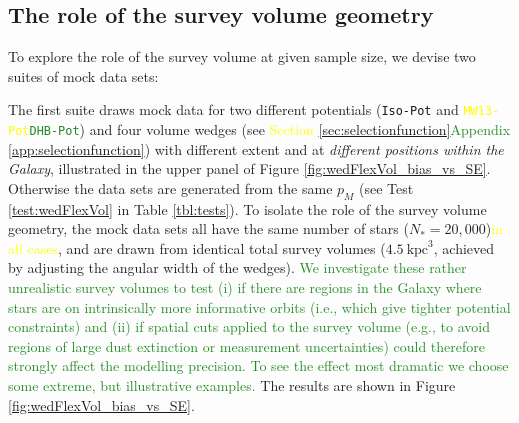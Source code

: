 \documentclass[iop,revtex4,numberedappendix,appendixfloats]{emulateapj}
\newcommand{\pmodel}{\ensuremath{p_M}}
\newcommand{\NEW}[1]{\textcolor{ForestGreen}{#1}}
\newcommand{\OLD}[1]{\textcolor{Yellow}{#1}}%
\begin{document}
\subsection{The role of the survey volume geometry} \label{sec:results_obsvolume}

To explore the role of the survey volume at given sample size, we devise two suites of mock data sets: 

The first suite draws mock data for two different potentials (\texttt{Iso-Pot} and \OLD{\texttt{MW13-Pot}}\NEW{\texttt{DHB-Pot}}) and four volume wedges (see \OLD{Section \ref{sec:selectionfunction}}\NEW{Appendix \ref{app:selectionfunction}}) with different extent and at {\it different positions within the Galaxy}, illustrated in the upper panel of Figure \ref{fig:wedFlexVol_bias_vs_SE}. Otherwise the data sets are generated from the same \pmodel{} (see Test \ref{test:wedFlexVol} in Table \ref{tbl:tests}). To isolate the role of the survey volume geometry, the mock data sets all have the same number of stars ($N_{*} = 20,000$)\OLD{in all cases}, and are drawn from identical total survey volumes ($4.5~\text{kpc}^3$, achieved by adjusting the angular width of the wedges).
\NEW{We investigate these rather unrealistic survey volumes to test (i) if there are regions in the Galaxy where stars are on intrinsically more informative orbits (i.e., which give tighter potential constraints) and (ii) if spatial cuts applied to the survey volume (e.g., to avoid regions of large dust extinction or measurement uncertainties) could therefore strongly affect the modelling precision. To see the effect most dramatic we choose some extreme, but illustrative examples.}
The results are shown in Figure \ref{fig:wedFlexVol_bias_vs_SE}.
\end{document}
